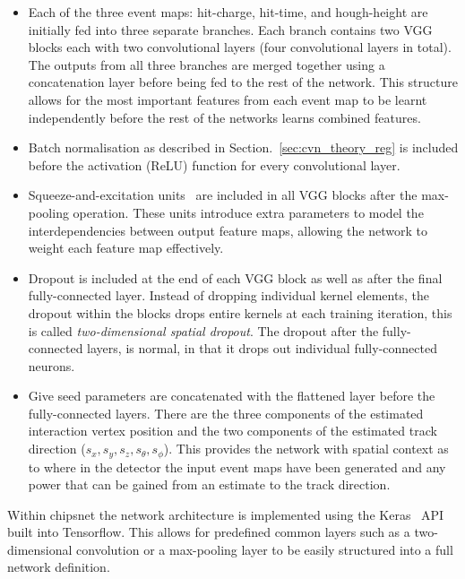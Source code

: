 \begin{itemize}
    \item Each of the three event maps: hit-charge, hit-time, and hough-height are initially fed
          into three separate branches. Each branch contains two VGG blocks each with two
          convolutional layers (four convolutional layers in total). The outputs from all three
          branches are merged together using a concatenation layer before being fed to the rest of
          the network. This structure allows for the most important features from each event map
          to be learnt independently before the rest of the networks learns combined features.

    \item Batch normalisation as described in Section.~\ref{sec:cvn_theory_reg} is included before
          the activation (ReLU) function for every convolutional layer.

    \item Squeeze-and-excitation units~\cite{hu2018} are included in all VGG blocks after the
          max-pooling operation. These units introduce extra parameters to model the
          interdependencies between output feature maps, allowing the network to weight each
          feature map effectively.

    \item Dropout is included at the end of each VGG block as well as after the final
          fully-connected layer. Instead of dropping individual kernel elements, the dropout
          within the blocks drops entire kernels at each training iteration, this is called
          \emph{two-dimensional spatial dropout}. The dropout after the fully-connected layers, is
          normal, in that it drops out individual fully-connected neurons.

    \item Give seed parameters are concatenated with the flattened layer before the
          fully-connected layers. There are the three components of the estimated interaction
          vertex position and the two components of the estimated track direction ($s_{x},s_{y},
              s_{z},s_{\theta},s_{\phi}$). This provides the network with spatial context as to where
          in the detector the input event maps have been generated and any power that can be
          gained from an estimate to the track direction.
\end{itemize}

Within chipsnet the network architecture is implemented using the Keras~\cite{chollet2015} API
built into Tensorflow. This allows for predefined common layers such as a two-dimensional
convolution or a max-pooling layer to be easily structured into a full network definition.

